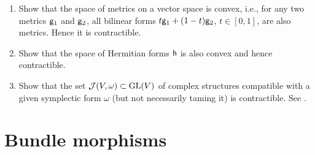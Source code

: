 \begin{xca}
    \begin{enumerate}
        \item Show that the space of metrics on a vector space is convex, i.e., for any two metrics $\mathsf{g}_1$ and $\mathsf{g}_2$, all bilinear forms $t\mathsf{g}_1+(1-t)\mathsf{g}_2$, $t\in[0,1]$, are also metrics. Hence it is contractible.
        \item Show that the space of Hermitian forms $\mathsf{h}$ is also convex and hence contractible.
        \item Show that the set $\mathcal{J}(V,\omega)\subset \operatorname{GL}(V)$ of complex structures compatible with a given symplectic form $\omega$ (but not necessarily taming it) is contractible. See \cite[Prop.~7.5.7]{RS1}.
    \end{enumerate}
\end{xca}







\section{Bundle morphisms}\label{sec: bundle morphisms}

